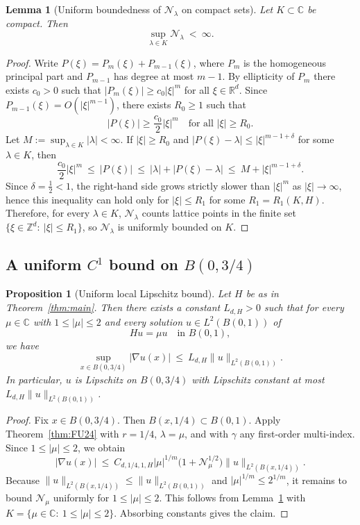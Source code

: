 \documentclass[12pt, reqno]{amsart}
\theoremstyle{plain}
\newtheorem{prp}[thm]{Proposition}
\newtheorem{lem}[thm]{Lemma}
\theoremstyle{remark}
\newcommand{\C}{\mathbb{C}}
\newcommand{\R}{\mathbb{R}}
\newcommand{\Z}{\mathbb{Z}}
\begin{document}
\begin{lem}[Uniform boundedness of $\mathcal N_\lambda$ on compact sets]\label{lem:Nlambda-compact}
Let $K\subset\C$ be compact. Then
$$
\sup_{\lambda\in K}\mathcal N_\lambda\ <\ \infty.
$$
\end{lem}

\begin{proof}
Write $P(\xi) = P_m(\xi)+P_{m-1}(\xi)$, where $P_m$ is the homogeneous principal part and $P_{m-1}$ has degree at most $m-1$.
By ellipticity of $P_m$ there exists $c_0>0$ such that $|P_m(\xi)|\ge c_0|\xi|^m$ for all $\xi\in\R^d$.
Since $P_{m-1}(\xi) = O(|\xi|^{m-1})$, there exists $R_0\ge 1$ such that
$$
|P(\xi)|\ge \frac{c_0}{2}|\xi|^m\quad \text{for all }|\xi|\ge R_0.
$$
Let $M := \sup_{\lambda\in K}|\lambda|<\infty$.
If $|\xi|\ge R_0$ and $|P(\xi)-\lambda|\le|\xi|^{m-1+\delta}$ for some $\lambda\in K$, then
$$
\frac{c_0}{2}|\xi|^m\ \le\ |P(\xi)|
\ \le\ |\lambda|+|P(\xi)-\lambda|
\ \le\ M+|\xi|^{m-1+\delta}.
$$
Since $\delta = \tfrac12<1$, the right-hand side grows strictly slower than $|\xi|^m$ as $|\xi|\to\infty$, hence this inequality can hold only for $|\xi|\le R_1$ for some $R_1 = R_1(K,H)$.
Therefore, for every $\lambda\in K$, $\mathcal N_\lambda$ counts lattice points in the finite set $\{\xi\in\Z^d:\ |\xi|\le R_1\}$, so $\mathcal N_\lambda$ is uniformly bounded on $K$.
\end{proof}

\subsection{A uniform $C^1$ bound on $B(0,3/4)$}

\begin{prp}[Uniform local Lipschitz bound]\label{prp:uniform-lip}
Let $H$ be as in Theorem~\ref{thm:main}.
Then there exists a constant $L_{d,H}>0$ such that for every $\mu\in\C$ with $1\le|\mu|\le 2$
and every solution $u\in L^2(B(0,1))$ of
$$
Hu = \mu u\quad\text{in }B(0,1),
$$
we have
$$
\sup_{x\in B(0,3/4)}|\nabla u(x)|\ \le\ L_{d,H} \|u\|_{L^2(B(0,1))}.
$$
In particular, $u$ is Lipschitz on $B(0,3/4)$ with Lipschitz constant at most
$L_{d,H}\|u\|_{L^2(B(0,1))}$.
\end{prp}

\begin{proof}
Fix $x\in B(0,3/4)$. Then $B(x,1/4)\subset B(0,1)$.
Apply Theorem~\ref{thm:FU24} with $r = 1/4$, $\lambda = \mu$, and with $\gamma$ any first-order multi-index.
Since $1\le|\mu|\le 2$, we obtain
$$
|\nabla u(x)|\ \le\ C_{d,1/4,1,H} |\mu|^{1/m}\bigl(1+\mathcal N_\mu^{1/2}\bigr) \|u\|_{L^2(B(x,1/4))}.
$$
Because $\|u\|_{L^2(B(x,1/4))}\le\|u\|_{L^2(B(0,1))}$ and $|\mu|^{1/m}\le 2^{1/m}$, it remains to bound $\mathcal N_\mu$ uniformly for $1\le|\mu|\le 2$.
This follows from Lemma~\ref{lem:Nlambda-compact} with $K = \{\mu\in\C:\ 1\le|\mu|\le 2\}$.
Absorbing constants gives the claim.
\end{proof}
\end{document}
